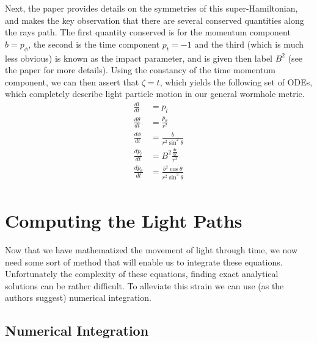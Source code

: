 \documentclass{article}
\begin{document}
Next, the paper provides details on the symmetries of this super-Hamiltonian, and makes the key observation that there are several conserved quantities along the rays path. The first quantity conserved is for the momentum component $b = p_\phi$, the second is the time component $p_t=-1$ and the third (which is much less obvious) is known as the impact parameter, and is given then label $B^2$ (see the paper for more details). Using the constancy of the time momentum component, we can then assert that $\zeta = t$, which yields the following set of ODEs, which completely describe light particle motion in our general wormhole metric.
\begin{align*}
\frac{dl}{dt} &= p_l\\
\frac{d\theta}{dt} &= \frac{p_\theta}{r^2}\\
\frac{d\phi}{dt} &= \frac{b}{r^2\sin^2\theta}\\
\frac{dp_l}{dt} &= B^{2}\frac{\frac{dr}{dl}}{r^3}\\
\frac{dp_\theta}{dt} &= \frac{b^2\cos\theta}{r^2\sin^3\theta}\\
\end{align*}

\section{Computing the Light Paths}
Now that we have mathematized the movement of light through time, we now need some sort of method that will enable us to integrate these equations. Unfortunately the complexity of these equations, finding exact analytical solutions can be rather difficult. To alleviate this strain we can use (as the authors suggest) numerical integration.
\subsection{Numerical Integration}
\end{document}
